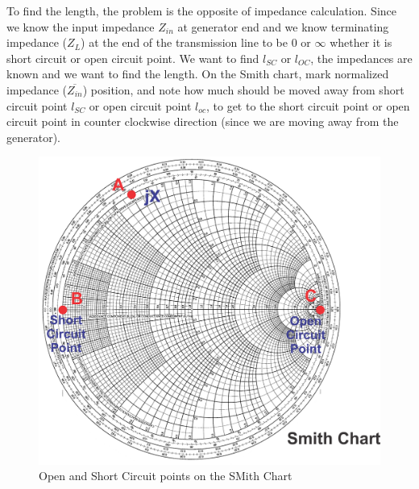 To find the length, the problem is the opposite of impedance calculation.  Since we know the input impedance $ Z_{in} $ at generator end  and we know terminating impedance ($ Z_{L} $) at the end of the transmission line to be 0 or $ \infty $ whether it is short circuit or open circuit point. We want to find $ l_{SC} $ or $ l_{OC} $, the impedances are known and we want to find the length.
On the Smith chart, mark normalized impedance ($ \overline{Z_{in}} $) position, and note how much should be moved away from short circuit point $ l_{SC} $ or open circuit point $ l_{oc} $, to get to the short circuit point or open circuit point in counter clockwise direction (since we are moving away from the generator).
\begin{figure}[h]
\centering
\includegraphics[width=1\linewidth]{./graphics/group10diagram6}
\caption{Open and Short Circuit points on the SMith Chart}
\end{figure} 

